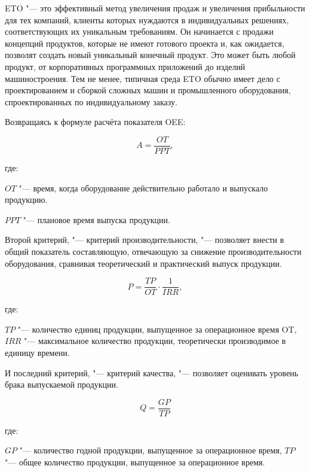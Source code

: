 ETO "--- это эффективный метод увеличения продаж и увеличения прибыльности для тех компаний, клиенты которых нуждаются в индивидуальных решениях, соответствующих их уникальным требованиям. Он начинается с продажи концепций продуктов, которые не имеют готового проекта и, как ожидается, позволят создать новый уникальный конечный продукт. Это может быть любой продукт, от корпоративных программных приложений до изделий машиностроения. Тем не менее, типичная среда ETO обычно имеет дело с проектированием и сборкой сложных машин и промышленного оборудования, спроектированных по индивидуальному заказу.

Возвращаясь к формуле расчёта показателя OEE:

\begin{equation}
	A = \frac{OT}{PPT},
\end{equation}

\noindent где:

\noindent $OT$ "---  время, когда оборудование действительно работало и выпускало продукцию.

\noindent $PPT$ "--- плановое время выпуска продукции.

Второй критерий, "--- критерий производительности, "--- позволяет внести в общий показатель составляющую, отвечающую за снижение производительности оборудования, сравнивая теоретический и практический выпуск продукции.

\begin{equation}
	P = \frac{TP}{OT} \cdot \frac{1}{IRR},
\end{equation}

\noindent где:
 
\noindent $TP$ "--- количество единиц продукции, выпущенное за операционное время OT,
\noindent $IRR$ "--- максимальное количество продукции, теоретически производимое в единицу времени.

И последний критерий, "--- критерий качества, "--- позволяет оценивать уровень брака выпускаемой продукции.

\begin{equation}
	Q = \frac{GP}{TP}
\end{equation}

\noindent где:

\noindent $GP$ "--- количество годной продукции, выпущенное за операционное время,
\noindent $TP$ "--- общее количество продукции, выпущенное за операционное время.

